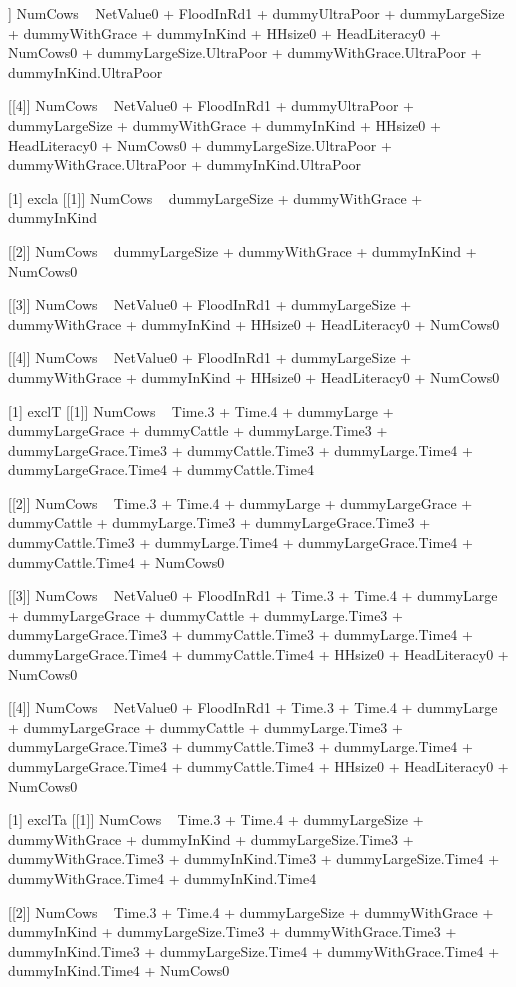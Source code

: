 \begin{Schunk}
\begin{Soutput}
[[3]]
NumCows ~ NetValue0 + FloodInRd1 + dummyUltraPoor + dummyLargeSize + 
    dummyWithGrace + dummyInKind + HHsize0 + HeadLiteracy0 + 
    NumCows0 + dummyLargeSize.UltraPoor + dummyWithGrace.UltraPoor + 
    dummyInKind.UltraPoor

[[4]]
NumCows ~ NetValue0 + FloodInRd1 + dummyUltraPoor + dummyLargeSize + 
    dummyWithGrace + dummyInKind + HHsize0 + HeadLiteracy0 + 
    NumCows0 + dummyLargeSize.UltraPoor + dummyWithGrace.UltraPoor + 
    dummyInKind.UltraPoor

[1] excla
[[1]]
NumCows ~ dummyLargeSize + dummyWithGrace + dummyInKind

[[2]]
NumCows ~ dummyLargeSize + dummyWithGrace + dummyInKind + NumCows0

[[3]]
NumCows ~ NetValue0 + FloodInRd1 + dummyLargeSize + dummyWithGrace + 
    dummyInKind + HHsize0 + HeadLiteracy0 + NumCows0

[[4]]
NumCows ~ NetValue0 + FloodInRd1 + dummyLargeSize + dummyWithGrace + 
    dummyInKind + HHsize0 + HeadLiteracy0 + NumCows0

[1] exclT
[[1]]
NumCows ~ Time.3 + Time.4 + dummyLarge + dummyLargeGrace + dummyCattle + 
    dummyLarge.Time3 + dummyLargeGrace.Time3 + dummyCattle.Time3 + 
    dummyLarge.Time4 + dummyLargeGrace.Time4 + dummyCattle.Time4

[[2]]
NumCows ~ Time.3 + Time.4 + dummyLarge + dummyLargeGrace + dummyCattle + 
    dummyLarge.Time3 + dummyLargeGrace.Time3 + dummyCattle.Time3 + 
    dummyLarge.Time4 + dummyLargeGrace.Time4 + dummyCattle.Time4 + 
    NumCows0

[[3]]
NumCows ~ NetValue0 + FloodInRd1 + Time.3 + Time.4 + dummyLarge + 
    dummyLargeGrace + dummyCattle + dummyLarge.Time3 + dummyLargeGrace.Time3 + 
    dummyCattle.Time3 + dummyLarge.Time4 + dummyLargeGrace.Time4 + 
    dummyCattle.Time4 + HHsize0 + HeadLiteracy0 + NumCows0

[[4]]
NumCows ~ NetValue0 + FloodInRd1 + Time.3 + Time.4 + dummyLarge + 
    dummyLargeGrace + dummyCattle + dummyLarge.Time3 + dummyLargeGrace.Time3 + 
    dummyCattle.Time3 + dummyLarge.Time4 + dummyLargeGrace.Time4 + 
    dummyCattle.Time4 + HHsize0 + HeadLiteracy0 + NumCows0

[1] exclTa
[[1]]
NumCows ~ Time.3 + Time.4 + dummyLargeSize + dummyWithGrace + 
    dummyInKind + dummyLargeSize.Time3 + dummyWithGrace.Time3 + 
    dummyInKind.Time3 + dummyLargeSize.Time4 + dummyWithGrace.Time4 + 
    dummyInKind.Time4

[[2]]
NumCows ~ Time.3 + Time.4 + dummyLargeSize + dummyWithGrace + 
    dummyInKind + dummyLargeSize.Time3 + dummyWithGrace.Time3 + 
    dummyInKind.Time3 + dummyLargeSize.Time4 + dummyWithGrace.Time4 + 
    dummyInKind.Time4 + NumCows0


\end{Soutput}
\end{Schunk}
